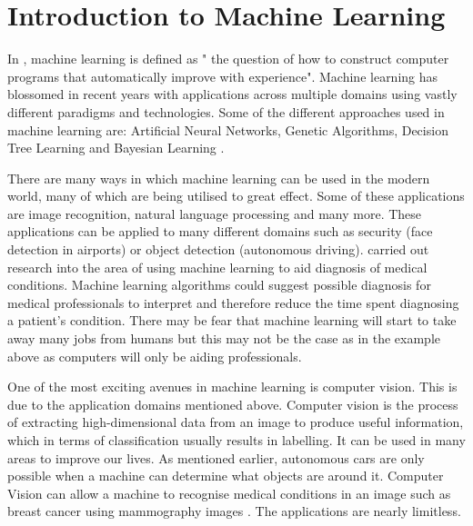 \section{Introduction to Machine Learning}
In \parencite{MLANN}, machine learning is defined as " the question of how to
construct computer programs that automatically improve with experience".
Machine learning has blossomed in recent years with applications across multiple
domains using vastly different paradigms and technologies. 
Some of the different approaches used in machine learning are: Artificial Neural Networks, Genetic Algorithms, Decision Tree Learning and Bayesian Learning \parencite{MLANN}.

There are many ways in which machine learning can be used in the modern world,
many of which are being utilised to great effect.
Some of these applications are image recognition, natural language
processing and many more.
These applications can be applied to many different domains such as security (face detection in airports) or object detection (autonomous driving).
\parencite{medical} carried out research into the area of using machine learning to aid diagnosis of medical conditions.
Machine learning algorithms could suggest possible diagnosis for medical professionals to interpret and therefore reduce the time spent diagnosing a patient's condition.
There may be fear that machine learning will start to take away many jobs
from
humans but this may not be the case as in the example above as computers will only be aiding professionals.

One of the most exciting avenues in machine learning is computer
vision.
This is due to the application domains mentioned above. 
Computer vision is the process of extracting high-dimensional data from an image to produce useful information, which in terms of classification usually results in labelling. It can be used in many areas to improve our lives. As
mentioned earlier, autonomous cars are only possible when a machine can
determine what objects are around it. Computer Vision can allow a machine to
recognise medical conditions in an image such as breast cancer using mammography images \parencite{medical}. The applications are nearly limitless.